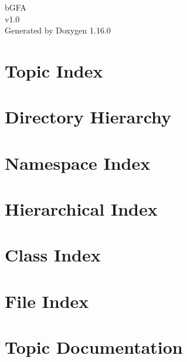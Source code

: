 \documentclass[twoside]{book}
\newcommand{\+}{\discretionary{\mbox{\scriptsize$\hookleftarrow$}}{}{}}
\newcommand{\clearemptydoublepage}{%
    \newpage{\pagestyle{empty}\cleardoublepage}%
  }
\begin{document}
  \raggedbottom
    \hypersetup{pageanchor=false,
                bookmarksnumbered=true,
                pdfencoding=unicode
               }
  \begin{titlepage}
  \vspace*{7cm}
  \begin{center}%
  {\Large b\+GFA}\\
  [1ex]\large v1.\+0 \\
  \vspace*{1cm}
  {\large Generated by Doxygen 1.16.0}\\
  \end{center}
  \end{titlepage}
  \clearemptydoublepage
  \tableofcontents
  \clearemptydoublepage
  \hypersetup{pageanchor=true}
\chapter{Topic Index}

\chapter{Directory Hierarchy}

\chapter{Namespace Index}

\chapter{Hierarchical Index}

\chapter{Class Index}

\chapter{File Index}

\chapter{Topic Documentation}


\end{document}
